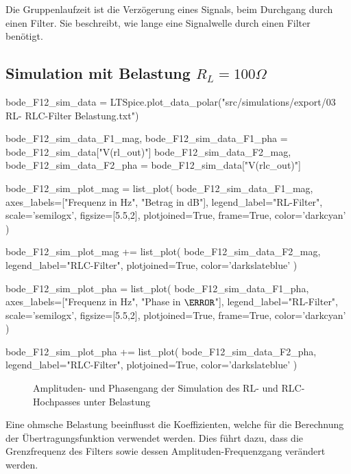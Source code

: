 Die Gruppenlaufzeit ist die Verzögerung eines Signals, beim Durchgang durch einen Filter.
Sie beschreibt, wie lange eine Signalwelle durch einen Filter benötigt.

\subsection{Simulation mit Belastung $R_L=100\Omega$}

\begin{sagesilent}
    bode_F12_sim_data = LTSpice.plot_data_polar("src/simulations/export/03 RL- RLC-Filter Belastung.txt")

    bode_F12_sim_data_F1_mag, bode_F12_sim_data_F1_pha = bode_F12_sim_data["V(rl_out)"]
    bode_F12_sim_data_F2_mag, bode_F12_sim_data_F2_pha = bode_F12_sim_data["V(rlc_out)"]

    bode_F12_sim_plot_mag = list_plot(
        bode_F12_sim_data_F1_mag,
        axes_labels=["Frequenz in Hz", "Betrag in dB"],
        legend_label="RL-Filter",
        scale='semilogx',
        figsize=[5.5,2],
        plotjoined=True,
        frame=True,
        color='darkcyan'
    )

    bode_F12_sim_plot_mag += list_plot(
        bode_F12_sim_data_F2_mag,
        legend_label="RLC-Filter",
        plotjoined=True,
        color='darkslateblue'
    )

    bode_F12_sim_plot_pha = list_plot(
        bode_F12_sim_data_F1_pha,
        axes_labels=["Frequenz in Hz", "Phase in $\degree$"],
        legend_label="RL-Filter",
        scale='semilogx',
        figsize=[5.5,2],
        plotjoined=True,
        frame=True,
        color='darkcyan'
    )

    bode_F12_sim_plot_pha += list_plot(
        bode_F12_sim_data_F2_pha,
        legend_label="RLC-Filter",
        plotjoined=True,
        color='darkslateblue'
    )
\end{sagesilent}

\begin{figure}[H]
    \centering
    \begin{subfigure}{\textwidth}
        \centering
    \end{subfigure}
    \quad
    \begin{subfigure}{\textwidth}
        \centering
    \end{subfigure}
    \caption{Amplituden- und Phasengang der Simulation des RL- und RLC-Hochpasses unter Belastung}
    \label{fig:F12_Sim}
\end{figure}

Eine ohmsche Belastung beeinflusst die Koeffizienten, welche für die Berechnung der Übertragungsfunktion verwendet werden.
Dies führt dazu, dass die Grenzfrequenz des Filters sowie dessen Amplituden-Frequenzgang verändert werden.  